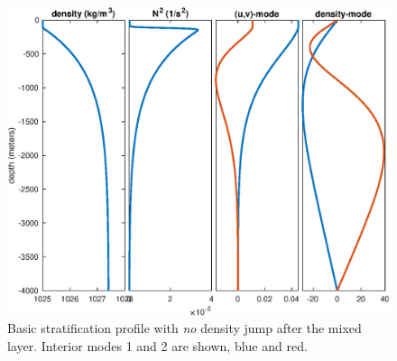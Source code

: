\documentclass{article}
\begin{document}
\begin{figure}
\vspace{-30pt}
    \includegraphics[width=1.0\textwidth]{ModesWithDeltaRho0}
  \caption{Basic stratification profile with \emph{no} density jump after the mixed layer. Interior modes 1 and 2 are shown, blue and red.}
  \label{modes-no-deltarho}
\end{figure}
\end{document}
